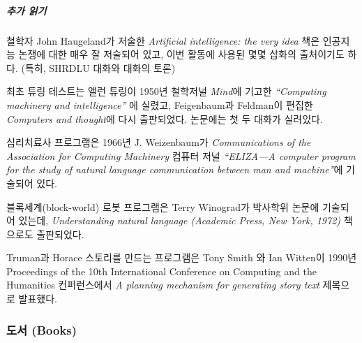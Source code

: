 \documentclass[]{article}
\begin{document}
\subparagraph{추가 읽기}\label{section-279}

철학자 John Haugeland가 저술한 \emph{Artificial intelligence: the very
idea} 책은 인공지능 논쟁에 대한 매우 잘 저술되어 있고, 이번 활동에
사용된 몇몇 삽화의 출처이기도 하다. (특히, SHRDLU 대화와 대화의 토론)

최초 튜링 테스트는 앨런 튜링이 1950년 철학저널 \emph{Mind}에 기고한
\emph{``Computing machinery and intelligence''} 에 실렸고, Feigenbaum과
Feldman이 편집한 \emph{Computers and thought}에 다시 출판되었다.
논문에는 첫 두 대화가 실려있다.

심리치료사 프로그램은 1966년 J. Weizenbaum가 \emph{Communications of the
Association for Computing Machinery} 컴퓨터 저널 \emph{``ELIZA---A
computer program for the study of natural language communication between
man and machine''}에 기술되어 있다.

블록세계(block-world) 로봇 프로그램은 Terry Winograd가 박사학위 논문에
기술되어 있는데, \emph{Understanding natural language (Academic Press,
New York, 1972)} 책으로도 출판되었다.

Truman과 Horace 스토리를 만드는 프로그램은 Tony Smith 와 Ian Witten이
1990년 Proceedings of the 10th International Conference on Computing and
the Humanities 컨퍼런스에서 \emph{A planning mechanism for generating
story text} 제목으로 발표했다.


\subsubsection{도서 (Books)}\label{books}
\end{document}

